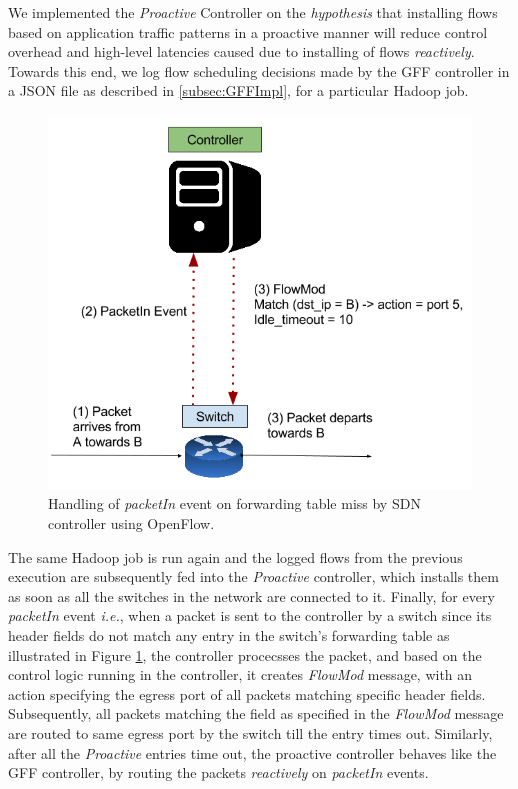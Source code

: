 We implemented the \textit{Proactive} Controller on the \textit{hypothesis} that installing flows based on application traffic patterns in a proactive manner will reduce control overhead and high-level latencies caused due to installing of flows \textit{reactively}. Towards this end, we log flow scheduling decisions made by the GFF controller in a JSON file as described in \ref{subsec:GFFImpl}, for a particular Hadoop job. 
\begin{figure}[!ht] 
	\centerline{\includegraphics[scale=0.42]{graphics/chapter5/packetinOpenFlow.png}}
	\caption{Handling of \textit{packetIn} event on forwarding table miss by SDN controller using OpenFlow.}
	\label{fig:packetinOpenFlow}
\end{figure}
The same Hadoop job is run again and the logged flows from the previous execution are subsequently fed into the \textit{Proactive} controller, which installs them as soon as all the switches in the network are connected to it. Finally, for every \textit{packetIn} event \textit{i.e.}, when a packet is sent to the controller by a switch since its header fields do not match any entry in the switch's forwarding table as illustrated in Figure \ref{fig:packetinOpenFlow}, the controller procecsses the packet, and based on the control logic running in the controller, it creates \textit{FlowMod} message, with an action specifying the egress port of all packets matching  specific header fields. Subsequently, all packets matching the field as specified in the \textit{FlowMod} message are routed to same egress port by the switch till the entry times out. Similarly, after all the \textit{Proactive} entries time out, the proactive controller behaves like the GFF controller, by routing the packets \textit{reactively} on \textit{packetIn} events. 

